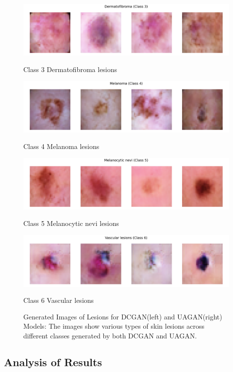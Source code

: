 \documentclass{article}
\begin{document}
\begin{figure}[htbp]
\begin{minipage}{0.45\textwidth}
        \includegraphics[width=\linewidth]{uagan-class_3_Dermatofibroma.png}
        \caption{Class 3 Dermatofibroma lesions}
        
        \includegraphics[width=\linewidth]{uagan-class_4_Melanoma.png}
        \caption{Class 4 Melanoma lesions}
        
        \includegraphics[width=\linewidth]{uagan-class_5_Melanocytic_nevi.png}
        \caption{Class 5 Melanocytic nevi lesions}

        \includegraphics[width=\linewidth]{uagan-class_6_Vascular_lesions.png}
        \caption{Class 6 Vascular lesions}
    \end{minipage}
    \setcounter{figure}{2}
    \caption{Generated Images of Lesions for DCGAN(left) and UAGAN(right) Models: The images show various types of skin lesions across different classes generated by both DCGAN and UAGAN.}
    \label{fig:comparison_dcgan_uagan}
\end{figure}

\subsection{Analysis of Results}
\end{document}

